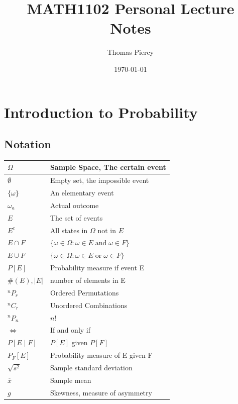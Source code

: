 \documentclass[12pt]{article}
\title{\textbf{MATH1102 Personal Lecture Notes}}
\author{Thomas Piercy}
\date{\today{}}
\newcommand*{\Perm}[2]{{}^{#1}\!P_{#2}}%
\newcommand*{\Comb}[2]{{}^{#1}C_{#2}}%
\begin{document}
\maketitle
\hrulefill
{}
\tableofcontents
\newpage
\section{Introduction to Probability}
\subsection*{Notation}
\begin{table}[H]
    \begin{tabular}{|l|l|}
        \hline
        \(\Omega\) & Sample Space, The certain event \\ \hline
        \(\emptyset\) & Empty set, the impossible event \\ \hline
        \(\{\omega\}\) & An elementary event \\ \hline
        \(\omega_a\) & Actual outcome \\ \hline
        \(E\) & The set of events \\ \hline
        \(E^c\) & All states in \(\Omega\) not in \(E\) \\ \hline      
        \(E\cap F\) & \(\{\omega\in\Omega:\omega\in E\;\text{and}\;\omega\in F\}\) \\ \hline
        \(E\cup F\) & \(\{\omega\in\Omega:\omega\in E\;\text{or}\;\omega\in F\}\) \\ \hline
        \(P[E]\) & Probability measure if event E \\ \hline
        \(\#(E),\vert E\vert\) & number of elements in E \\ \hline
        \(\Perm{n}{r}\) & Ordered Permutations \\  \hline
        \(\Comb{n}{r}\) & Unordered Combinations \\  \hline
        \(\Perm{n}{n}\) & \(n!\) \\  \hline
        \(\iff\) & If and only if \\ \hline
        \(P[E\mid F]\) & \(P[E]\) given \(P[F]\) \\ \hline
        \(P_F[E]\) & Probability measure of E given F \\ \hline
        \(\sqrt{s^2}\) & Sample standard deviation \\ \hline
        \(\overline{x}\) & Sample mean \\ \hline
        \(g\) & Skewness, measure of asymmetry \\ \hline

\end{tabular}
\end{table}
\end{document}

